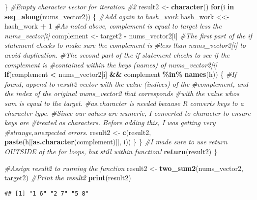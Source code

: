 \documentclass[
]{article}
\newenvironment{Shaded}{\begin{snugshade}}{\end{snugshade}}
\newcommand{\CommentTok}[1]{\textcolor[rgb]{0.56,0.35,0.01}{\textit{#1}}}
\newcommand{\ControlFlowTok}[1]{\textcolor[rgb]{0.13,0.29,0.53}{\textbf{#1}}}
\newcommand{\DecValTok}[1]{\textcolor[rgb]{0.00,0.00,0.81}{#1}}
\newcommand{\FunctionTok}[1]{\textcolor[rgb]{0.13,0.29,0.53}{\textbf{#1}}}
\newcommand{\NormalTok}[1]{#1}
\newcommand{\OtherTok}[1]{\textcolor[rgb]{0.56,0.35,0.01}{#1}}
\newcommand{\SpecialCharTok}[1]{\textcolor[rgb]{0.81,0.36,0.00}{\textbf{#1}}}
\begin{document}
\begin{Shaded}
\begin{Highlighting}[]
\NormalTok{  \}}
  \CommentTok{\#Empty character vector for iteration \#2}
\NormalTok{  result2 }\OtherTok{\textless{}{-}} \FunctionTok{character}\NormalTok{()}
  \ControlFlowTok{for}\NormalTok{(i }\ControlFlowTok{in} \FunctionTok{seq\_along}\NormalTok{(nums\_vector2)) \{}
    \CommentTok{\#Add again to hash\_work}
\NormalTok{    hash\_work }\OtherTok{\textless{}\textless{}{-}}\NormalTok{ hash\_work }\SpecialCharTok{+} \DecValTok{1}
    \CommentTok{\#As noted above, complement is equal to target less the nums\_vector[i]}
\NormalTok{    complement }\OtherTok{\textless{}{-}}\NormalTok{ target2 }\SpecialCharTok{{-}}\NormalTok{ nums\_vector2[i]}
    \CommentTok{\#The first part of the if statement checks to make sure the complement is }
    \CommentTok{\#less than nums\_vector2[i] to avoid duplication. }
    \CommentTok{\#The second part of the if statement checks to see if the complement is}
    \CommentTok{\#contained within the keys (names) of nums\_vector2[i]}
    \ControlFlowTok{if}\NormalTok{(complement }\SpecialCharTok{\textless{}}\NormalTok{ nums\_vector2[i] }\SpecialCharTok{\&\&}\NormalTok{ complement }\SpecialCharTok{\%in\%} \FunctionTok{names}\NormalTok{(h)) \{}
      \CommentTok{\#If found, append to result2 vector with the value (indices) of the}
      \CommentTok{\#complement, and the index of the original nums\_vector2 that corresponds }
      \CommentTok{\#with the value whos sum is equal to the target.}
      \CommentTok{\#as.character is needed because R converts keys to a character type.}
      \CommentTok{\#Since our values are numeric, I converted to character to ensure keys are}
      \CommentTok{\#treated as characters. Before adding this, I was getting very }
      \CommentTok{\#strange,unexpected errors.}
\NormalTok{      result2 }\OtherTok{\textless{}{-}} \FunctionTok{c}\NormalTok{(result2, }\FunctionTok{paste}\NormalTok{(h[[}\FunctionTok{as.character}\NormalTok{(complement)]], i))}
\NormalTok{    \}}
\NormalTok{  \}}
  \CommentTok{\#I made sure to use return OUTSIDE of the for loops, but still within function!}
  \FunctionTok{return}\NormalTok{(result2)}
\NormalTok{\}}

\CommentTok{\#Assign result2 to running the function}
\NormalTok{result2 }\OtherTok{\textless{}{-}} \FunctionTok{two\_sum2}\NormalTok{(nums\_vector2, target2)}
\CommentTok{\#Print the result2}
\FunctionTok{print}\NormalTok{(result2)}
\end{Highlighting}
\end{Shaded}

\begin{verbatim}
## [1] "1 6" "2 7" "5 8"
\end{verbatim}
\end{document}
